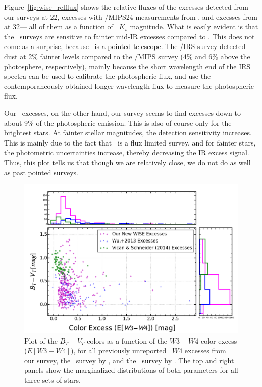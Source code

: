     Figure~\ref{fig:wise_relflux} shows the relative fluxes of the excesses detected from our surveys at 22\micron, excesses with \spitzer/MIPS24 measurements from \citet{Chen2014}, and excesses from \citet{Lawler2009} at 32\micron --- all of them as a function of \mass\ $K_s$ magnitude. What is easily evident is that the \spitzer\ surveys are sensitive to fainter mid-IR excesses compared to \WS. This does not come as a surprise, because \spitzer\ is a pointed telescope. The \spitzer/IRS survey detected dust at 2\% fainter levels compared to the \spitzer/MIPS survey (4\% and 6\% above the photosphere, respectively), mainly because the short wavelength end of the IRS spectra can be used to calibrate the photospheric flux, and use the contemporaneously obtained longer wavelength flux to measure the photospheric flux. 
    
    Our \WS\ excesses, on the other hand, our survey seems to find excesses down to about 9\% of the photospheric emission. This is also of course only for the brightest stars. At fainter stellar magnitudes, the detection sensitivity increases. This is mainly due to the fact that \WS\ is a flux limited survey, and for fainter stars, the photometric uncertainties increase, thereby decreasing the IR excess signal. Thus, this plot tells us that though we are relatively close, we do not do as well as past pointed surveys. 

    \begin{figure}
    \centering
    \includegraphics[width=.9\textwidth]{Ch5/wise_vs_wu_120pc}
    \caption[My \WS\ Disks vs. Other \WS\ Disks]{Plot of the $B_T-V_T$ colors as a function of the $W3-W4$ color excess ($E[W3-W4]$), for all previously unreported \WS\ $W4$ excesses from our survey, the \WS\ survey by \citet{Vican2014}, and the \WS\ survey by \citet{Wu2013}. The top and right panels show the marginalized distributions of both parameters for all three sets of stars.}
    \label{fig:wise_v_wise}
    \end{figure}
    
